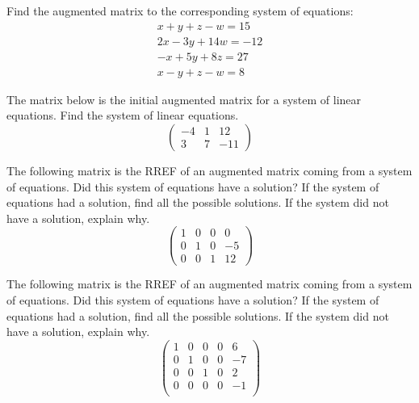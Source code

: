 \documentclass[11pt,letterpaper]{article}
\begin{document}

 Find the augmented matrix to the corresponding system of equations:
	\[
	\begin{gathered}
	x + y + z - w= 15 \\
	2x - 3y + 14w= -12 \\
	-x + 5y + 8z= 27 \\
	x - y + z - w= 8
	\end{gathered}
	\]



\newpage



 The matrix below is the initial augmented matrix for a system of linear equations. Find the system of linear equations. 
	\[
	\begin{pmatrix}
	-4 & 1 & 12 \\
	3 & 7 & -11
	\end{pmatrix}
	\]



\newpage



 The following matrix is the RREF of an augmented matrix coming from a system of equations. Did this system of equations have a solution? If the system of equations had a solution, find all the possible solutions. If the system did not have a solution, explain why. 
	\[
	\begin{pmatrix}
	1 & 0 & 0 & 0 \\
	0 & 1 & 0 & -5 \\
	0 & 0 & 1 & 12
	\end{pmatrix}
	\]



\newpage



 The following matrix is the RREF of an augmented matrix coming from a system of equations. Did this system of equations have a solution? If the system of equations had a solution, find all the possible solutions. If the system did not have a solution, explain why. 
	\[
	\begin{pmatrix}
	1 & 0 & 0 & 0 & 6 \\
	0 & 1 & 0 & 0 & -7 \\
	0 & 0 & 1 & 0 & 2 \\
	0 & 0 & 0 & 0 & -1 \\
	\end{pmatrix}
	\]
\end{document}
